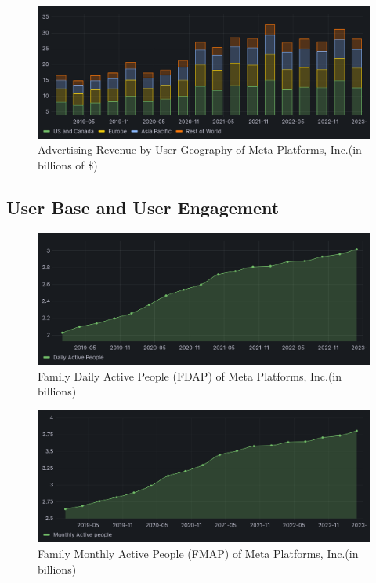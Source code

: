 \documentclass[12pt, a4paper]{article}
\begin{document}
\begin{figure}[H]
    \centering
    \includegraphics[width=1.00\textwidth]{advertising-revenue-by-user-geography}
    \caption{Advertising Revenue by User Geography of Meta Platforms, Inc.(in
    billions of \$)\cite{2023q1,2021q2Slides,2019q4Slides}}
    \label{fig:advertising-revenue-by-user-geography}
\end{figure}


\subsection*{User Base and User Engagement}

\begin{figure}[H]
    \centering
    \includegraphics[width=1.00\textwidth]{family-dap}
    \caption{Family Daily Active People (FDAP) of Meta Platforms, Inc.(in
    billions)\cite{2023q1,2021q2Slides,2019q4Slides}}
    \label{fig:family-dap}
\end{figure}

\begin{figure}[H]
    \centering
    \includegraphics[width=1.00\textwidth]{family-map}
    \caption{Family Monthly Active People (FMAP) of Meta Platforms, Inc.(in
    billions)\cite{2023q1,2021q2Slides,2019q4Slides}}
    \label{fig:family-map}
\end{figure}
\end{document}
